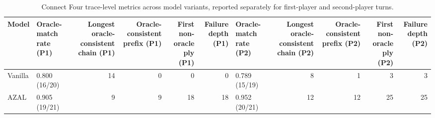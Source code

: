 \begin{table}[t]
\centering
\caption{Connect Four trace-level metrics across model variants, reported separately for first-player and second-player turns.}
\label{tab:connect4_trace_metrics}
\begin{tabular}{llrrrrlrrrr}
\toprule
Model & Oracle-match rate (P1) & Longest oracle-consistent chain (P1) & Oracle-consistent prefix (P1) & First non-oracle ply (P1) & Failure depth (P1) & Oracle-match rate (P2) & Longest oracle-consistent chain (P2) & Oracle-consistent prefix (P2) & First non-oracle ply (P2) & Failure depth (P2) \\
\midrule
Vanilla & 0.800 (16/20) & 14 & 0 & 0 & 0 & 0.789 (15/19) & 8 & 1 & 3 & 3 \\
AZAL & 0.905 (19/21) & 9 & 9 & 18 & 18 & 0.952 (20/21) & 12 & 12 & 25 & 25 \\
\bottomrule
\end{tabular}
\end{table}
